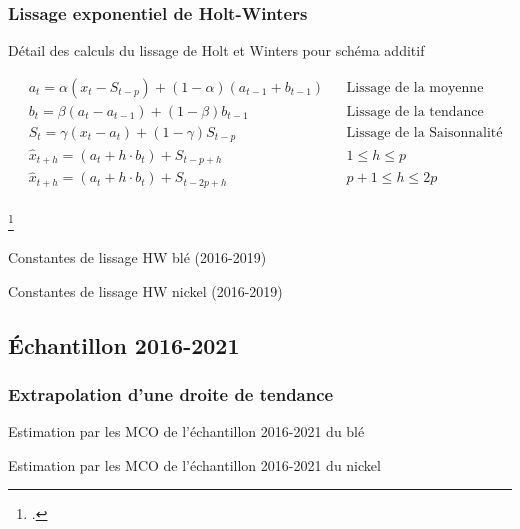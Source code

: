 \documentclass[12pt,a4paper]{article}
\begin{document}
\subsubsection{Lissage exponentiel de Holt-Winters}\label{appendix:hw_19}
\begin{table}[H]
    \caption[hw]{Détail des calculs du lissage de Holt et Winters pour schéma additif \footnotemark}
    \label{tab:hw}
    \begin{align*}
        &a_{t} = \alpha(x_{t} - S_{t-p}) + (1-\alpha)(a_{t-1} + b_{t-1}) & &\text{Lissage de la moyenne}\\
        &b_{t}= \beta (a_{t}-a_{t-1}) + (1-\beta) b_{t-1} & &\text{Lissage de la tendance}\\
        &S_{t} = \gamma (x_{t}-a_{t}) + (1-\gamma) S_{t-p} & &\text{Lissage de la Saisonnalité}\\
        &\hat{x}_{t+h} = (a_{t} + h \cdot b_{t}) + S_{t-p+h} & & 1\leq h \leq p \\
        &\hat{x}_{t+h} = (a_{t} + h \cdot b_{t}) + S_{t-2p+h} & & p+1 \leq h \leq 2p\\
    \end{align*}
\end{table}
\footcitetext{terraza}
\begin{table}[H]
    \centering
    \caption{Constantes de lissage HW blé (2016-2019)}
    \label{tab:hwout_ble19}
    \sffamily
    
\end{table}
\begin{table}[H]
    \centering
    \caption{Constantes de lissage HW nickel (2016-2019)}
    \label{tab:hwout_nickel19}
    \sffamily
    
\end{table}


\subsection{Échantillon 2016-2021}
\subsubsection{Extrapolation d'une droite de tendance}\label{appendix:extra_21}
\begin{table}[H]
    \centering
    \caption{Estimation par les MCO de l'échantillon 2016-2021 du blé}
    \label{tab:mco_ble21}
    \sffamily
    
\end{table}

\begin{table}[H]
    \centering
    \caption{Estimation par les MCO de l'échantillon 2016-2021 du nickel}
    \label{tab:mco_nickel21}
    \sffamily
    
\end{table}
\end{document}
